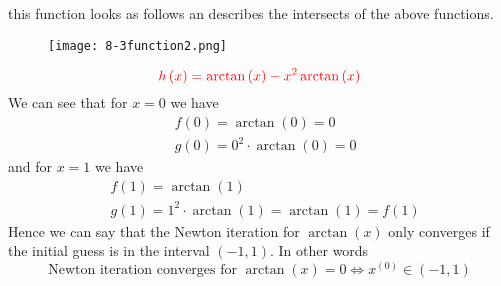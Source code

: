 \documentclass{article}
\newcommand\xz{x^{\left(0\right)}}
\begin{document}
this function looks as follows an describes the intersects of the above functions.
\begin{figure}[!hbt]
    \centering
\texttt{[image: 8-3function2.png]}
\end{figure}
\begin{equation*}
    \color{red}h\left(x\right)= \arctan\left(x\right) - x^{2}\arctan\left(x\right)
\end{equation*}
We can see that for $x=0$ we have 
\begin{align*}
    &f\left(0\right) = \arctan\left(0\right) = 0 \\
    &g\left(0\right) = 0^{2}\cdot \arctan\left(0\right) = 0
\end{align*}
and for $x=1$ we have
\begin{align*}
    &f\left(1\right) = \arctan\left(1\right) \\
    &g\left(1\right) = 1^{2} \cdot \arctan\left(1\right) = \arctan\left(1\right) = f\left(1\right) 
\end{align*}
Hence we can say that the Newton iteration for $\arctan\left(x\right)$ only converges if the initial guess is in the interval $\left(-1,1\right)$. In other words
\begin{equation*}
    \text{Newton iteration converges for } \arctan\left(x\right) =  0 \Longleftrightarrow \xz\in \left(-1,1\right)
\end{equation*}

\pagebreak
\end{document}
